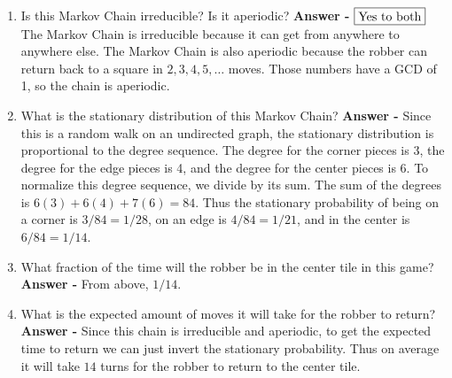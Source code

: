 \documentclass[10pt,landscape]{article}
\begin{document}
\begin{multicols}{3}
\begin{center}
\end{center}

\begin{enumerate}[label=\alph*)]
    \item Is this Markov Chain irreducible? Is it aperiodic? \textbf{Answer - } $\boxed{\textnormal{Yes to both}}$ The Markov Chain is irreducible because it can get from anywhere to anywhere else. The Markov Chain is also aperiodic because the robber can return back to a square in $2, 3, 4, 5, \dots$ moves. Those numbers have a GCD of 1, so the chain is aperiodic.
    \item What is the stationary distribution of this Markov Chain? \textbf{Answer - }Since this is a random walk on an undirected graph, the stationary distribution is proportional to the degree sequence. The degree for the corner pieces is 3, the degree for the edge pieces is 4, and the degree for the center pieces is 6. To normalize this degree sequence, we divide by its sum. The sum of the degrees is $6(3) + 6(4) + 7(6) = 84$. Thus the stationary probability of being on a corner is $3/84 = 1/28$, on an edge is $4/84 =  1/21$, and in the center is $6/84 = 1/14$.
    \item What fraction of the time will the robber be in the center tile in this game? \textbf{Answer - } From above, $\boxed{1/14}$.
    \item What is the expected amount of moves it will take for the robber to return? \textbf{Answer - } Since this chain is irreducible and aperiodic, to get the expected time to return we can just invert the stationary probability. Thus on average it will take $\boxed{14}$ turns for the robber to return to the center tile.
\end{enumerate}



\end{multicols}
\end{document}
